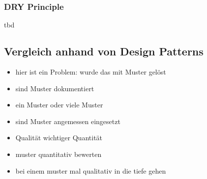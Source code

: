 \subsubsection{DRY Principle}
tbd

\subsection{Vergleich anhand von Design Patterns}
\begin{itemize}
    \item hier ist ein Problem: wurde das mit Muster gelöst
    \item sind Muster dokumentiert
    \item ein Muster oder viele Muster
    \item sind Muster angemessen eingesetzt
    \item Qualität wichtiger Quantität
    \item muster quantitativ bewerten
    \item bei einem muster mal qualitativ in die tiefe gehen
\end{itemize}
